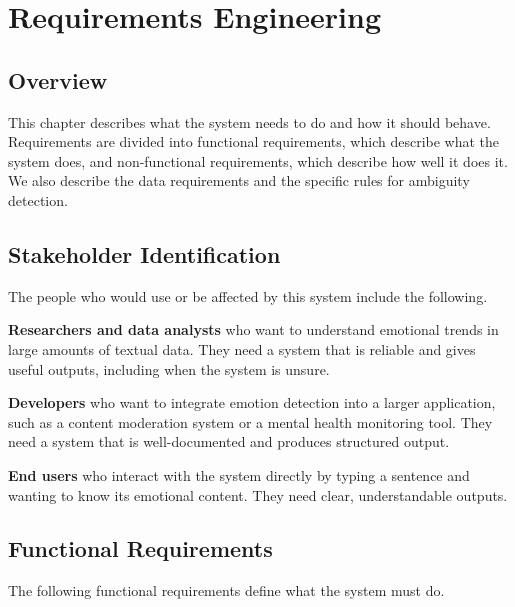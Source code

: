 \chapter{Requirements Engineering}

\section{Overview}

This chapter describes what the system needs to do and how it should behave. Requirements
are divided into functional requirements, which describe what the system does, and
non-functional requirements, which describe how well it does it. We also describe the data
requirements and the specific rules for ambiguity detection.

\section{Stakeholder Identification}

The people who would use or be affected by this system include the following.

\textbf{Researchers and data analysts} who want to understand emotional trends in large amounts
of textual data. They need a system that is reliable and gives useful outputs, including
when the system is unsure.

\textbf{Developers} who want to integrate emotion detection into a larger application, such as a
content moderation system or a mental health monitoring tool. They need a system that is
well-documented and produces structured output.

\textbf{End users} who interact with the system directly by typing a sentence and wanting to know
its emotional content. They need clear, understandable outputs.

\section{Functional Requirements}

The following functional requirements define what the system must do.

